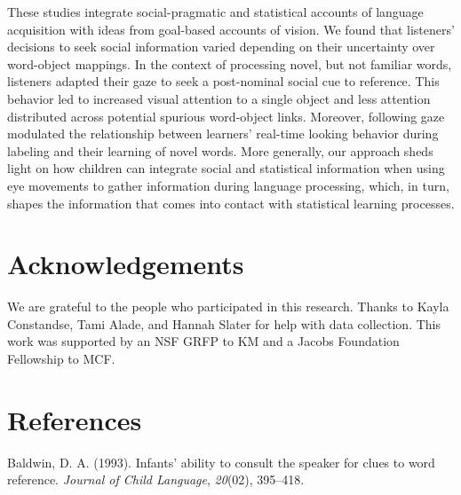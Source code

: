 \documentclass[10pt, letterpaper]{article}
\begin{document}
These studies integrate social-pragmatic and statistical accounts of
language acquisition with ideas from goal-based accounts of vision. We
found that listeners' decisions to seek social information varied
depending on their uncertainty over word-object mappings. In the context
of processing novel, but not familiar words, listeners adapted their
gaze to seek a post-nominal social cue to reference. This behavior led
to increased visual attention to a single object and less attention
distributed across potential spurious word-object links. Moreover,
following gaze modulated the relationship between learners' real-time
looking behavior during labeling and their learning of novel words. More
generally, our approach sheds light on how children can integrate social
and statistical information when using eye movements to gather
information during language processing, which, in turn, shapes the
information that comes into contact with statistical learning processes.

\vspace{1em}

\vspace{1em}

\hypertarget{acknowledgements}{%
\section{Acknowledgements}\label{acknowledgements}}

We are grateful to the people who participated in this research. Thanks
to Kayla Constandse, Tami Alade, and Hannah Slater for help with data
collection. This work was supported by an NSF GRFP to KM and a Jacobs
Foundation Fellowship to MCF.

\hypertarget{references}{%
\section{References}\label{references}}

\setlength{\parindent}{-0.1in} 
\setlength{\leftskip}{0.125in}

\noindent

\hypertarget{refs}{}
\leavevmode\hypertarget{ref-baldwin1993infants}{}%
Baldwin, D. A. (1993). Infants' ability to consult the speaker for clues
to word reference. \emph{Journal of Child Language}, \emph{20}(02),
395--418.
\end{document}

